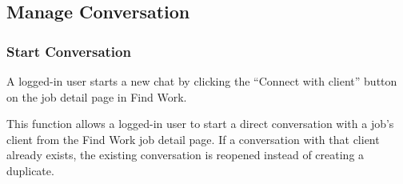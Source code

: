 
\subsection{Manage Conversation}

\subsubsection{Start Conversation}

 A logged-in user starts a new chat by clicking the ``Connect with client'' button on the job detail page in Find Work.

 This function allows a logged-in user to start a direct conversation with a job's client from the Find Work job detail page. If a conversation with that client already exists, the existing conversation is reopened instead of creating a duplicate.


